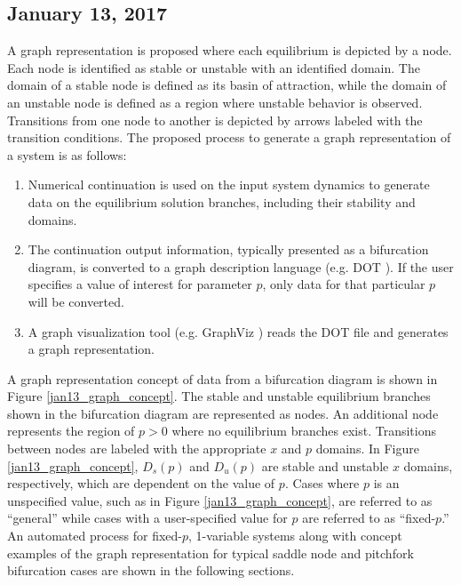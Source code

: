 \documentclass[12pt]{article}
\begin{document}
\subsection{January 13, 2017}
\label{jan13}
A graph representation is proposed where each equilibrium is depicted by a node. Each node is identified as stable or unstable with an identified domain. The domain of a stable node is defined as its basin of attraction, while the domain of an unstable node is defined as a region where unstable behavior is observed. Transitions from one node to another is depicted by arrows labeled with the transition conditions. The proposed process to generate a graph representation of a system is as follows:
	
\begin{enumerate}
  \item Numerical continuation is used on the input system dynamics to generate data on the equilibrium solution branches, including their stability and domains.
  \item The continuation output information, typically presented as a bifurcation diagram, is converted to a graph description language (e.g. DOT \cite{graphviz1,graphviz2}). If the user specifies a value of interest for parameter $p$, only data for that particular $p$ will be converted.
  \item A graph visualization tool (e.g. GraphViz \cite{graphviz3}) reads the DOT file and generates a graph representation.
\end{enumerate}

A graph representation concept of data from a bifurcation diagram is shown in Figure \ref{jan13_graph_concept}. The stable and unstable equilibrium branches shown in the bifurcation diagram are represented as nodes. An additional node represents the region of $p>0$ where no equilibrium branches exist. Transitions between nodes are labeled with the appropriate $x$ and $p$ domains. In Figure \ref{jan13_graph_concept}, $D_s(p)$ and $D_u(p)$ are stable and unstable $x$ domains, respectively, which are dependent on the value of $p$. Cases where $p$ is an unspecified value, such as in Figure \ref{jan13_graph_concept}, are referred to as ``general'' while cases with a user-specified value for $p$ are referred to as ``fixed-$p$.'' An automated process for fixed-$p$, 1-variable systems along with concept examples of the graph representation for typical saddle node and pitchfork bifurcation cases are shown in the following sections. 
\end{document}
